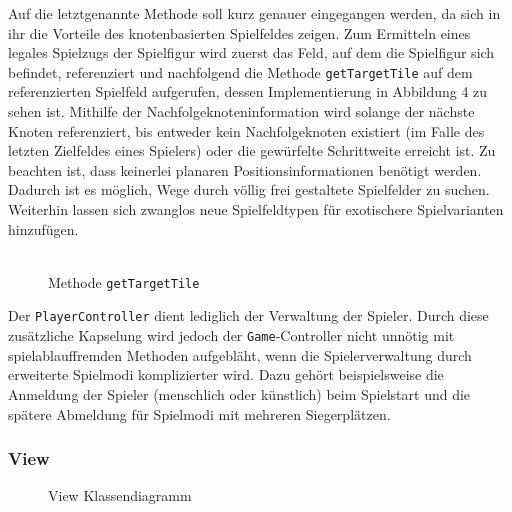 \documentclass[conference]{IEEEtran}
\begin{document}
Auf die letztgenannte Methode soll kurz genauer eingegangen werden, da sich in ihr die Vorteile des knotenbasierten Spielfeldes zeigen. Zum Ermitteln eines legales Spielzugs der Spielfigur wird zuerst das Feld, auf dem die Spielfigur sich befindet, referenziert und nachfolgend die Methode \texttt{getTargetTile} auf dem referenzierten Spielfeld aufgerufen, dessen Implementierung in Abbildung 4 zu sehen ist. Mithilfe der Nachfolgeknoteninformation wird solange der n\"achste Knoten referenziert, bis entweder kein Nachfolgeknoten existiert (im Falle des letzten Zielfeldes eines Spielers) oder die gew\"urfelte Schrittweite erreicht ist.
Zu beachten ist, dass keinerlei planaren Positionsinformationen ben\"otigt werden. Dadurch ist es m\"oglich, Wege durch v\"ollig frei gestaltete Spielfelder
zu suchen. Weiterhin lassen sich zwanglos neue Spielfeldtypen f\"ur exotischere Spielvarianten hinzuf\"ugen.\\\\
\begin{figure}[]
    \centering
    \caption{Methode \texttt{getTargetTile}}
    \label{gtt}
\end{figure}
Der \texttt{PlayerController} dient lediglich der Verwaltung der Spieler. Durch diese zus\"atzliche Kapselung wird jedoch der \texttt{Game}-Controller
nicht unn\"otig mit spielablauffremden Methoden aufgebl\"aht, wenn die Spielerverwaltung durch erweiterte Spielmodi komplizierter wird. Dazu geh\"ort beispielsweise die Anmeldung der Spieler (menschlich oder k\"unstlich) beim Spielstart und die sp\"atere Abmeldung f\"ur Spielmodi mit mehreren Siegerpl\"atzen.\\

\subsubsection{View}
\begin{figure}[]
    \centering
    \caption{View Klassendiagramm}
\end{figure}
\end{document}
